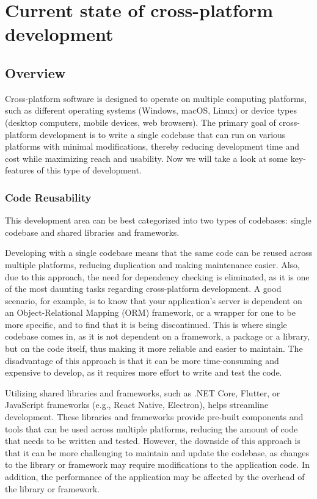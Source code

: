 \chapter{Current state of cross-platform development}

\section{Overview}

Cross-platform software is designed to operate on multiple computing platforms, 
such as different operating systems (Windows, macOS, Linux) or device types (desktop computers, mobile devices, web browsers).
The primary goal of cross-platform development is to write a single codebase that can run on various platforms with minimal modifications, 
thereby reducing development time and cost while maximizing reach and usability.
Now we will take a look at some key-features of this type of development.

\subsection{Code Reusability}
This development area can be best categorized into two types of codebases: single codebase and shared libraries and frameworks.

\par
Developing with a single codebase means that the same code can be reused across multiple platforms, reducing duplication and making maintenance easier.
Also, due to this approach, the need for dependency checking is eliminated, as it is one of the most daunting tasks regarding cross-platform development.
A good scenario, for example, is to know that your application's server is dependent on an Object-Relational Mapping (ORM) framework, or a wrapper for one to be more specific, and to find that it is being discontinued.
This is where single codebase comes in, as it is not dependent on a framework, a package or a library, 
but on the code itself, thus making it more reliable and easier to maintain. 
The disadvantage of this approach is that it can be more time-consuming and expensive to develop, as it requires more effort to write and test the code.

\par
Utilizing shared libraries and frameworks, such as .NET Core, Flutter, or JavaScript frameworks (e.g., React Native, Electron), helps streamline development.
These libraries and frameworks provide pre-built components and tools that can be used across multiple platforms, reducing the amount of code that needs to be written and tested.
However, the downside of this approach is that it can be more challenging to maintain and update the codebase, as changes to the library or framework may require modifications to the application code.
In addition, the performance of the application may be affected by the overhead of the library or framework.


